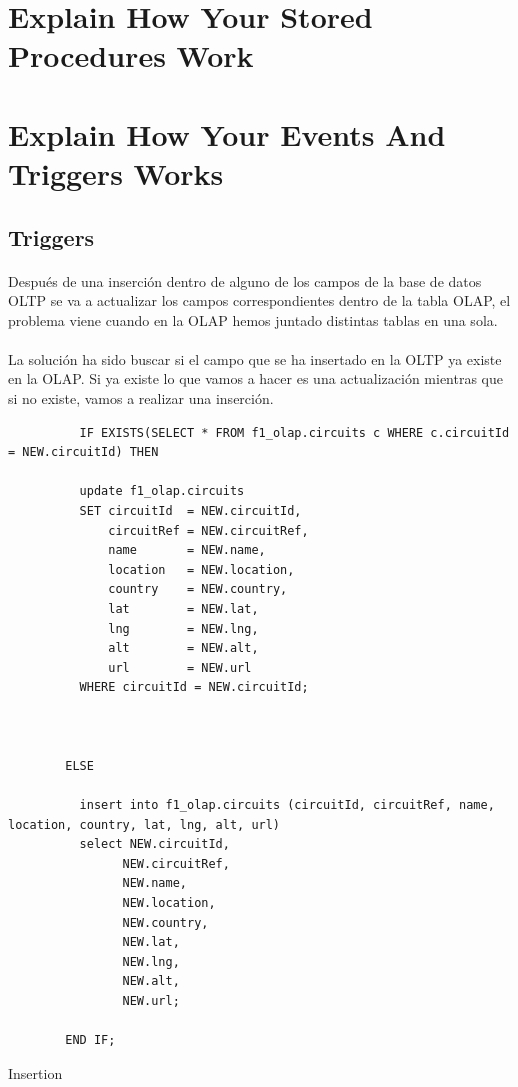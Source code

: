 \documentclass[a4paper 
,twoside
]{article}
\begin{document}
\pagebreak
\section{Explain How Your Stored Procedures Work}
\pagebreak
\section{Explain How Your Events And Triggers Works}
  \subsection{Triggers}
    \paragraph{}
    Después de una inserción dentro de alguno de los campos de la base de datos OLTP se va a actualizar los campos correspondientes dentro de la tabla OLAP, el problema viene cuando en la OLAP hemos juntado distintas tablas en una sola.
    \paragraph{}
    La solución ha sido buscar si el campo que se ha insertado en la OLTP ya existe en la OLAP. Si ya existe lo que vamos a hacer es una actualización mientras que si no existe, vamos a realizar una inserción.

    \begin{listing}[H]
      \begin{verbatim}
          IF EXISTS(SELECT * FROM f1_olap.circuits c WHERE c.circuitId = NEW.circuitId) THEN

          update f1_olap.circuits
          SET circuitId  = NEW.circuitId,
              circuitRef = NEW.circuitRef,
              name       = NEW.name,
              location   = NEW.location,
              country    = NEW.country,
              lat        = NEW.lat,
              lng        = NEW.lng,
              alt        = NEW.alt,
              url        = NEW.url
          WHERE circuitId = NEW.circuitId;



        ELSE

          insert into f1_olap.circuits (circuitId, circuitRef, name, location, country, lat, lng, alt, url)
          select NEW.circuitId,
                NEW.circuitRef,
                NEW.name,
                NEW.location,
                NEW.country,
                NEW.lat,
                NEW.lng,
                NEW.alt,
                NEW.url;

        END IF;

      \end{verbatim}
      \caption{Insertion}
      \label{lst:insert}
    \end{listing}
\end{document}
